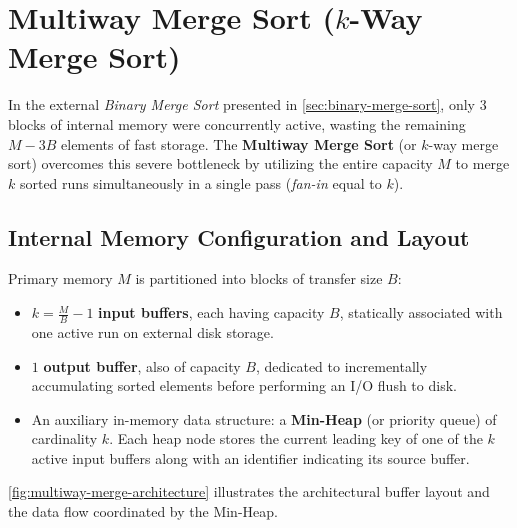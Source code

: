 \section{Multiway Merge Sort (\texorpdfstring{$k$}{k}-Way Merge Sort)}
\label{sec:multiway-merge-sort}

In the external \textit{Binary Merge Sort} presented in \autoref{sec:binary-merge-sort}, only 3 blocks of internal memory were concurrently active, wasting the remaining $M - 3B$ elements of fast storage. The \textbf{Multiway Merge Sort} (or $k$-way merge sort) overcomes this severe bottleneck by utilizing the entire capacity $M$ to merge $k$ sorted runs simultaneously in a single pass (\textit{fan-in} equal to $k$).

\subsection{Internal Memory Configuration and Layout}
\label{subsec:multiway-memory-layout}

Primary memory $M$ is partitioned into blocks of transfer size $B$:
\begin{itemize}
  \item $k = \frac{M}{B} - 1$ \textbf{input buffers}, each having capacity $B$, statically associated with one active run on external disk storage.
  \item $1$ \textbf{output buffer}, also of capacity $B$, dedicated to incrementally accumulating sorted elements before performing an I/O flush to disk.
  \item An auxiliary in-memory data structure: a \textbf{Min-Heap} (or priority queue) of cardinality $k$. Each heap node stores the current leading key of one of the $k$ active input buffers along with an identifier indicating its source buffer.
\end{itemize}

\autoref{fig:multiway-merge-architecture} illustrates the architectural buffer layout and the data flow coordinated by the Min-Heap.

